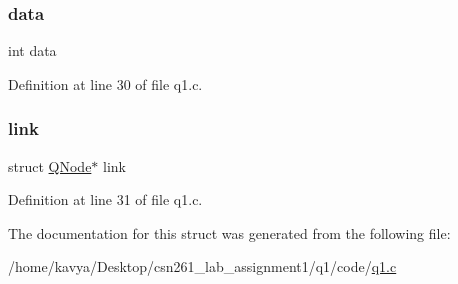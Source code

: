 \subsubsection{\texorpdfstring{data}{data}}
{\footnotesize\ttfamily int data}



Definition at line 30 of file q1.\+c.

\mbox{\label{struct_q_node_aeb974434dabad67698cafa3278f141a0}} 
\subsubsection{\texorpdfstring{link}{link}}
{\footnotesize\ttfamily struct \hyperlink{struct_q_node}{Q\+Node}$\ast$ link}



Definition at line 31 of file q1.\+c.



The documentation for this struct was generated from the following file\+:\begin{DoxyCompactItemize}
\item 
/home/kavya/\+Desktop/csn261\+\_\+lab\+\_\+assignment1/q1/code/\hyperlink{q1_8c}{q1.\+c}\end{DoxyCompactItemize}
